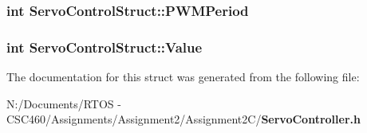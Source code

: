 \subsubsection{\setlength{\rightskip}{0pt plus 5cm}int {\bf Servo\-Control\-Struct::PWMPeriod}}\label{struct_servo_control_struct_eda62effc8835514d5ef5fff030675f7}


\subsubsection{\setlength{\rightskip}{0pt plus 5cm}int {\bf Servo\-Control\-Struct::Value}}\label{struct_servo_control_struct_047905c4171c70f80d339487f7f00dff}




The documentation for this struct was generated from the following file:\begin{CompactItemize}
\item 
N:/Documents/RTOS - CSC460/Assignments/Assignment2/Assignment2C/{\bf Servo\-Controller.h}\end{CompactItemize}
